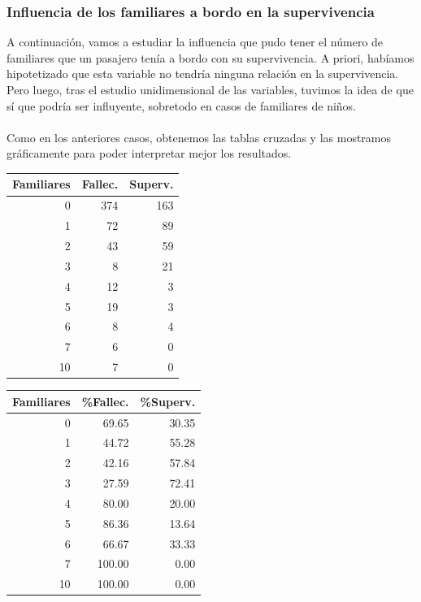 \documentclass{article}
\begin{document}
\subsubsection{Influencia de los familiares a bordo en la supervivencia}

A continuación, vamos a estudiar la influencia que pudo tener el número de familiares que un pasajero tenía a bordo con su supervivencia. A priori, habíamos hipotetizado que esta variable no tendría ninguna relación en la supervivencia. Pero luego, tras el estudio unidimensional de las variables, tuvimos la idea de que sí que podría ser influyente, sobretodo en casos de familiares de niños.\\\\
Como en los anteriores casos, obtenemos las tablas cruzadas y las mostramos gráficamente para poder interpretar mejor los resultados.

\begin{table}[htbp]
    \centering
    \begin{minipage}{.5\textwidth}
        \centering
        \begin{tabular}{rrr}
              \hline
            Familiares & Fallec. & Superv. \\ 
              \hline
            0 & 374 & 163 \\ 
              1 &  72 &  89 \\ 
              2 &  43 &  59 \\ 
              3 &   8 &  21 \\ 
              4 &  12 &   3 \\ 
              5 &  19 &   3 \\ 
              6 &   8 &   4 \\ 
              7 &   6 &   0 \\ 
              10 &   7 &   0 \\ 
               \hline
        \end{tabular}
    \end{minipage}%
    \begin{minipage}{.5\textwidth}
        \centering
        \begin{tabular}{rrr}
              \hline
            Familiares & \%Fallec. & \%Superv. \\ 
              \hline
            0 & 69.65 & 30.35 \\ 
              1 & 44.72 & 55.28 \\ 
              2 & 42.16 & 57.84 \\ 
              3 & 27.59 & 72.41 \\ 
              4 & 80.00 & 20.00 \\ 
              5 & 86.36 & 13.64 \\ 
              6 & 66.67 & 33.33 \\ 
              7 & 100.00 & 0.00 \\ 
              10 & 100.00 & 0.00 \\ 
               \hline
        \end{tabular}
    \end{minipage}
\end{table}
\end{document}
